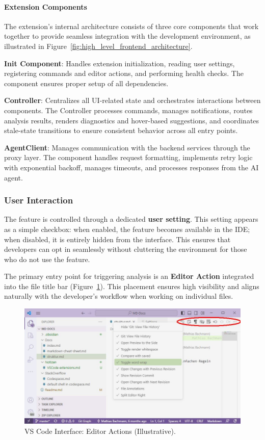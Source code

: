 \begin{spacing}{1.2}
\paragraph{Extension Components}
The extension's internal architecture consists of three core components that work together to provide seamless integration with the development environment, as illustrated in Figure~\ref{fig:high_level_frontend_architecture}.

\textbf{Init Component}: Handles extension initialization, reading user settings, registering commands and editor actions, and performing health checks. The component ensures proper setup of all dependencies.

\textbf{Controller}: Centralizes all UI-related state and orchestrates interactions between components. The Controller processes commands, manages notifications, routes analysis results, renders diagnostics and hover-based suggestions, and coordinates stale-state transitions to ensure consistent behavior across all entry points.

\textbf{AgentClient}: Manages communication with the backend services through the proxy layer. The component handles request formatting, implements retry logic with exponential backoff, manages timeouts, and processes responses from the AI agent.

\subsubsection{User Interaction}
The feature is controlled through a dedicated \textbf{user setting}. This setting appears as a simple checkbox: when enabled, the feature becomes available in the IDE; when disabled, it is entirely hidden from the interface. This ensures that developers can opt in seamlessly without cluttering the environment for those who do not use the feature.

The primary entry point for triggering analysis is an \textbf{Editor Action} integrated into the file title bar (Figure~\ref{fig:editor_action_implementation}). This placement ensures high visibility and aligns naturally with the developer’s workflow when working on individual files.

\begin{figure}[H]
    \centering
    \includegraphics[scale=0.4]{Images/editor_actions.jpg}
    \caption{VS Code Interface: Editor Actions (Illustrative).}
    \label{fig:editor_action_implementation}
\end{figure}


\end{spacing}
